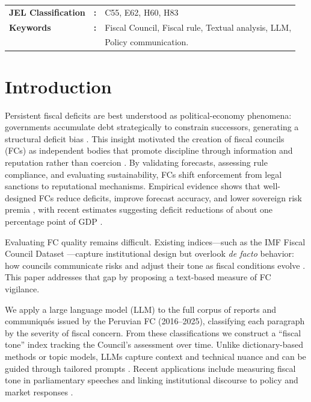 \documentclass[a4paper, fleqn, 12pt]{article}
\begin{document}
\vfill
\begin{tabular}{lll}
  \textbf{JEL Classification} & \textbf{:} & C55, E62, H60, H83 \\ 
  \textbf{Keywords} & \textbf{:} & Fiscal Council, Fiscal rule, Textual analysis, LLM, \\&&Policy communication.
\end{tabular}

\vfill

\newpage




\section{Introduction}

Persistent fiscal deficits are best understood as political-economy phenomena: governments accumulate debt strategically to constrain successors, generating a structural deficit bias \citep{AlesinaTabellini1990}. This insight motivated the creation of fiscal councils (FCs) as independent bodies that promote discipline through information and reputation rather than coercion \citep{CalmforsWrenLewis2011, DebrunJonung2019}. By validating forecasts, assessing rule compliance, and evaluating sustainability, FCs shift enforcement from legal sanctions to reputational mechanisms. Empirical evidence shows that well-designed FCs reduce deficits, improve forecast accuracy, and lower sovereign risk premia \citep{Beetsma2019, BrandleElsener2024}, with recent estimates suggesting deficit reductions of about one percentage point of GDP \citep{Capraru2022, Latifi2024}.

Evaluating FC quality remains difficult. Existing indices—such as the IMF Fiscal Council Dataset \citep{DebrunKinda2014}—capture institutional design but overlook \emph{de facto} behavior: how councils communicate risks and adjust their tone as fiscal conditions evolve \citep{BeetsmaDebrunSloof2022}. This paper addresses that gap by proposing a text-based measure of FC vigilance.

We apply a large language model (LLM) to the full corpus of reports and communiqués issued by the Peruvian FC (2016–2025), classifying each paragraph by the severity of fiscal concern. From these classifications we construct a ``fiscal tone'' index tracking the Council’s assessment over time. Unlike dictionary-based methods or topic models, LLMs capture context and technical nuance and can be guided through tailored prompts \citep{GilardiSchmid2023}. Recent applications include measuring fiscal tone in parliamentary speeches \citep{NieblerWindhager2023} and linking institutional discourse to policy and market responses \citep{Latifi2024}.
\end{document}
